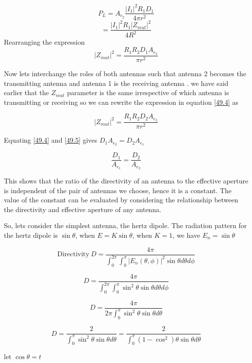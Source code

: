$$ P_{L} = A_{e_{2}}\dfrac{|I_{1}|^{2}R_{1}D_{1}}{4\pi r^{2}}$$
$$ = \dfrac{|I_{1}|^{2}R_{1}|Z_{mut}|^{2}}{4R^{2}}$$
Rearranging the expression 
\begin{equation}
\label{49.4}
|Z_{mut}|^{2}=\dfrac{R_{1}R_{2}D_{1}A_{e_{2}}}{\pi r^{2}}
\end{equation}


Now lets interchange the roles of both antennas such that antenna 2 becomes the transmitting antenna and antenna 1 is the receiving antenna . we have said earlier that the $Z_{mut}$ parameter is the same irrespective of which antenna is transmitting or receiving so we can rewrite the expression in equation \ref{49.4} as 

\begin{equation}
\label{49.5}
|Z_{mut}|^{2}=\dfrac{R_{1}R_{2}D_{2}A_{e_{2}}}{\pi r^{2}}
\end{equation}


Equating \ref{49.4} and \ref{49.5} gives $D_{1}A_{e_{2}}= D_{2}A_{e_{1}}$

\begin{equation}
\dfrac{D_{1}}{A_{e_{1}}}= \dfrac{D_{2}}{A_{e_{2}}}
\end{equation}
\newline

This shows that the ratio of the directivity of an antenna to the effective aperture is independent of the pair of antennas we choose, hence it is a constant. The value of the constant can be evaluated by considering the relationship between the directivity and effective aperture of any antenna.

So, lets consider the simplest antenna, the hertz dipole. The radiation pattern for the hertz dipole is $\sin\theta$, when $E=K\sin\theta$, when $K=1$, we have $E_{n}=\sin\theta$

$$\text{Directivity} \ D=\dfrac{4\pi}{\int_{0}^{2\pi}\int_{0}^{\pi}|E_n(\theta , \phi)|^{2} \sin\theta d\theta d\phi}$$

$$ D=\dfrac{4\pi}{\int_{0}^{2\pi}\int_{0}^{\pi}\sin^{2}\theta \sin\theta d\theta d\phi}$$

$$ D=\dfrac{4\pi}{2\pi\int_{0}^{\pi}\sin^{2}\theta \sin\theta d\theta}$$

$$ D=\dfrac{2}{\int_{0}^{\pi}\sin^{2}\theta \sin\theta d\theta} = \dfrac{2}{\int_{0}^{\pi}(1-\cos^{2})\theta \sin\theta d\theta} $$



let $\cos\theta = t$



